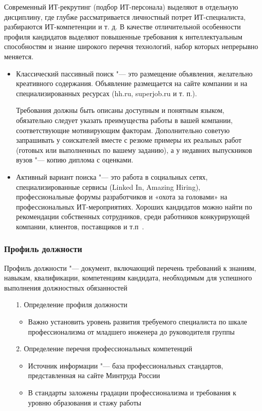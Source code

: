 \documentclass{../industrial-development}
\begin{document}
Современный ИТ-рекрутинг (подбор ИТ-персонала) выделяют в отдельную дисциплину, где глубже рассматривается личностный потрет ИТ-специалиста, разбираются ИТ-компетенции и т. д. В качестве отличительной особенности профиля кандидатов выделяют повышенные требования к интеллектуальным способностям и знание широкого перечня технологий, набор которых непрерывно меняется.
 \begin{itemize}
\item	\alert{Классический пассивный поиск} "--- это размещение объявления, желательно креативного содержания. Объявление размещается на сайте компании и на специализированных ресурсах (hh.ru, superjob.ru и т. п.). 

Требования должны быть описаны доступным и понятным языком, обязательно следует указать преимущества работы в вашей компании, соответствующие мотивирующим факторам. Дополнительно советую запрашивать у соискателей вместе с резюме примеры их реальных работ (готовых или выполненных по вашему заданию), а у недавних выпускников вузов "--- копию диплома с оценками. 

\item	\alert{Активный вариант поиска} "--- это работа в социальных сетях, специализированные сервисы (Linked In, Amazing Hiring), профессиональные форумы разработчиков и «охота за головами» на профессиональных ИТ-мероприятиях. Хороших кандидатов можно найти по рекомендации собственных сотрудников, среди работников конкурирующей компании, клиентов, поставщиков и т.п~\cite[с.~274--277]{Pererva}.
  \end{itemize}

\begin{frame} \frametitle{Профиль должности}

\alert{Профиль должности} "--- документ, включающий перечень требований к знаниям, навыкам, квалификации, компетенциям  кандидата, необходимым для успешного выполнения должностных обязанностей
  \begin{itemize}
		\item[1.] Определение профиля должности
  \begin{itemize}
	\item Важно установить уровень развития требуемого специалиста по шкале профессионализма от младшего инженера до руководителя группы
	
	  \end{itemize}
		
		\item[2.] Определение перечня профессиональных компетенций
		  \begin{itemize}
		\item Источник информации "--- база профессиональных стандартов, представленная на сайте Минтруда России
		\item В стандарты заложены градации профессионализма и требования к уровню образования и стажу работы
		  \end{itemize}
  \end{itemize}
\end{frame}
\end{document}

